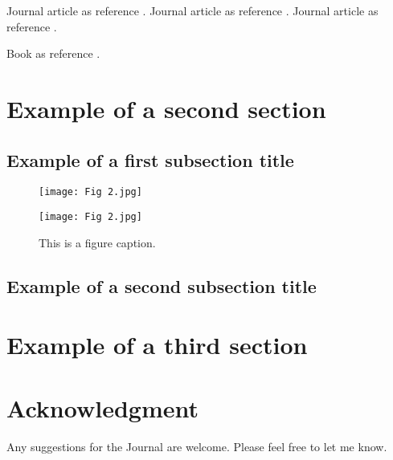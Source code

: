 \documentclass[12pt,onecolumn]{JASE}
\begin{document}
Journal article as reference \cite{Chuang2018}. Journal article as reference \cite{Ya2019}. Journal article as reference \cite{Chuang2018,Ya2019}.

Book as reference \cite{Benjamin2014}.
\section{Example of a second section}
\subsection{Example of a first subsection title}

\begin{figure}
\begin{minipage}{0.47\textwidth}
\texttt{[image: Fig 2.jpg]}
\end{minipage}
\hfill
\begin{minipage}{0.47\textwidth}
\texttt{[image: Fig 2.jpg]}
\end{minipage}

\captionsetup{justification=centering}
\caption{This is a figure caption.}
\label{fig:twosubs}
\end{figure}

\subsection{Example of a second subsection title}


\section{Example of a third section}

\section*{Acknowledgment}
Any suggestions for the Journal are welcome. Please feel free to let me know.

\FloatBarrier
\baselineskip=18pt
  \printbibliography
\end{document}
